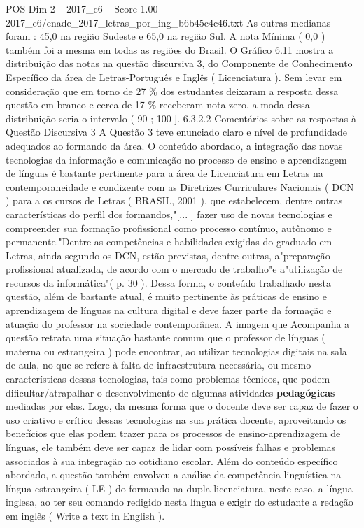\begin{textsample}{POS Dim 2 – 2017\_c6 – Score 1.00 – 2017\_c6/enade\_2017\_letras\_por\_ing\_b6b45c4c46.txt}
As outras medianas foram : 45,0 na região Sudeste e 65,0 na região Sul.
A nota Mínima ( 0,0 ) também foi a mesma em todas as regiões do Brasil.
O Gráfico 6.11 mostra a distribuição das notas na questão discursiva 3, do Componente de Conhecimento Específico da área de Letras-Português e Inglês ( Licenciatura ).
Sem levar em consideração que em torno de 27 \% dos estudantes deixaram a resposta dessa questão em branco e cerca de 17 \% receberam nota zero, a moda dessa distribuição seria o intervalo ( 90 ; 100 ]. 6.3.2.2 Comentários sobre as respostas à Questão Discursiva 3 A Questão 3 teve enunciado claro e nível de profundidade adequados ao formando da área.
O conteúdo abordado, a integração das novas tecnologias da informação e comunicação no processo de ensino e aprendizagem de línguas é bastante pertinente para a área de Licenciatura em Letras na contemporaneidade e condizente com as Diretrizes Curriculares Nacionais ( DCN ) para a os cursos de Letras ( BRASIL, 2001 ), que estabelecem, dentre outras características do perfil dos formandos,"[... ] fazer uso de novas tecnologias e compreender sua formação profissional como processo contínuo, autônomo e permanente."Dentre as competências e habilidades exigidas do graduado em Letras, ainda segundo os DCN, estão previstas, dentre outras, a"preparação profissional atualizada, de acordo com o mercado de trabalho"e a"utilização de recursos da informática"( p. 30 ).
Dessa forma, o conteúdo trabalhado nesta questão, além de bastante atual, é muito pertinente às práticas de ensino e aprendizagem de línguas na cultura digital e deve fazer parte da formação e atuação do professor na sociedade contemporânea.
A imagem que Acompanha a questão retrata uma situação bastante comum que o professor de línguas ( materna ou estrangeira ) pode encontrar, ao utilizar tecnologias digitais na sala de aula, no que se refere à falta de infraestrutura necessária, ou mesmo características dessas tecnologias, tais como problemas técnicos, que podem dificultar/atrapalhar o desenvolvimento de algumas atividades \textbf{pedagógicas} mediadas por elas.
Logo, da mesma forma que o docente deve ser capaz de fazer o uso criativo e crítico dessas tecnologias na sua prática docente, aproveitando os benefícios que elas podem trazer para os processos de ensino-aprendizagem de línguas, ele também deve ser capaz de lidar com possíveis falhas e problemas associados à sua integração no cotidiano escolar.
Além do conteúdo específico abordado, a questão também envolveu a análise da competência linguística na língua estrangeira ( LE ) do formando na dupla licenciatura, neste caso, a língua inglesa, ao ter seu comando redigido nesta língua e exigir do estudante a redação em inglês ( Write a text in English ).

\end{textsample}
